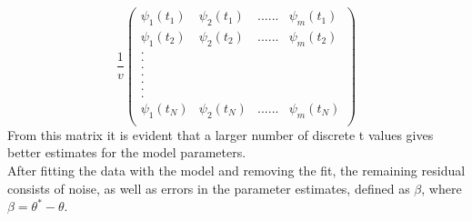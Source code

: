 \documentclass[12pt]{article}
\begin{document}
	$$
	\frac{1}{v}
	\begin{pmatrix}
	\psi_1(t_1)&\psi_2(t_1)&......&\psi_m(t_1)\\
	\psi_1(t_2)&\psi_2(t_2)&......&\psi_m(t_2)\\
	.\\
	.\\
	.\\
	.\\
	.\\
	.\\
	.\\
	\psi_1(t_N)&\psi_2(t_N)&......&\psi_m(t_N)\\
	
	\end{pmatrix}
	$$
	From this matrix it is evident that a larger number of discrete t values gives better estimates for the model parameters. \\
	After fitting the data with the model and removing the fit, the remaining residual consists of noise, as well as errors in the parameter estimates, defined as $\beta$, where $\beta=\theta^*-\theta$. 
	
\end{document}
